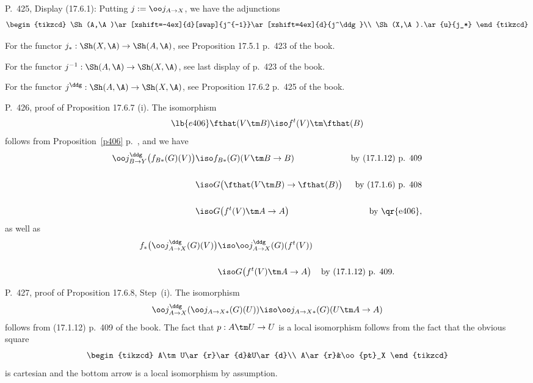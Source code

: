 \documentclass[12pt]{article}
\theoremstyle{remark}
\theoremstyle{definition}
\begin{document}
% 

\begin{s} 
P.~425, Display (17.6.1): Putting $j:=\oo j_{A\to X}$, we have the adjunctions 
$$
\begin{tikzcd}
\Sh(A,\A)\ar[xshift=-4ex]{d}[swap]{j^{-1}}\ar[xshift=4ex]{d}{j^\ddg}\\ 
\Sh(X,\A).\ar{u}{j_*}
\end{tikzcd}
$$ 

For the functor $j_*:\Sh(X,\A)\to\Sh(A,\A)$, see Proposition 17.5.1 p.~423 of the book. 

For the functor $j^{-1}:\Sh(A,\A)\to\Sh(X,\A)$, see last display of p.~423 of the book. 

For the functor $j^\ddg:\Sh(A,\A)\to\Sh(X,\A)$, see Proposition 17.6.2 p.~425 of the book.
\end{s}

%

\begin{s} 
P.~426, proof of Proposition 17.6.7 (i). The isomorphism 
\begin{equation}\lb{e406}
\fthat(V\tm B)\iso f^t(V)\tm\fthat(B)
\end{equation} 
follows from Proposition~\ref{p406} p.~, and we have 
\begin{align*} 
%
\oo j_{B\to Y}^\ddg\big(f_{B*}(G)(V)\big)&\iso f_{B*}(G)(V\tm B\to B)&\text{by (17.1.12) p. 409}\\ \\ 
%
&\iso G\big(\fthat(V\tm B)\to\fthat(B)\big)&\text{by (17.1.6) p. 408}\\ \\ 
%
&\iso G\big(f^t(V)\tm A\to A\big)&\text{by \qr{e406}}, 
% 
\end{align*} 
as well as 
\begin{align*} 
%
f_*\big(\oo j_{A\to X}^\ddg(G)(V)\big)&\iso\oo j_{A\to X}^\ddg(G)(f^t(V))\\ \\ 
%
&\iso G\big(f^t(V)\tm A\to A\big)&\text{by (17.1.12) p. 409}. 
% 
\end{align*}  
\end{s} 

% 

\begin{s}
P.~427, proof of Proposition 17.6.8, Step~(i). The isomorphism 
$$
\oo j_{A\to X}^\ddg(\oo j_{A\to X*}(G)(U))\iso\oo j_{A\to X*}(G)(U\tm A\to A)
$$ 
follows from (17.1.12) p.~409 of the book. The fact that $p:A\tm U\to U$ is a local isomorphism follows from the fact that the obvious square 
$$
\begin{tikzcd} 
A\tm U\ar{r}\ar{d}&U\ar{d}\\ 
A\ar{r}&\oo{pt}_X
\end{tikzcd}
$$ 
is cartesian and the bottom arrow is a local isomorphism by assumption. 
\end{s} 
\end{document}
